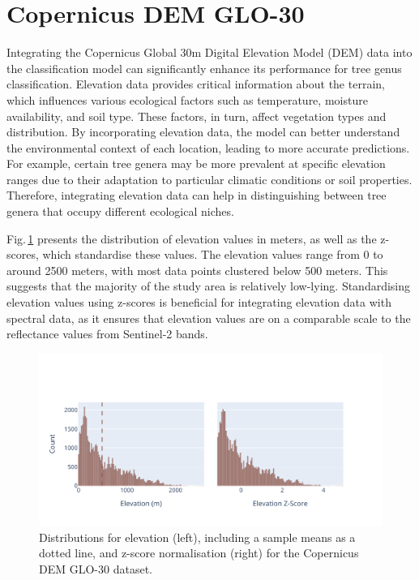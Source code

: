 \section{Copernicus DEM GLO-30}

Integrating the Copernicus Global 30m Digital Elevation Model (DEM) data into the classification model can significantly enhance its performance for tree genus classification. Elevation data provides critical information about the terrain, which influences various ecological factors such as temperature, moisture availability, and soil type. These factors, in turn, affect vegetation types and distribution. By incorporating elevation data, the model can better understand the environmental context of each location, leading to more accurate predictions. For example, certain tree genera may be more prevalent at specific elevation ranges due to their adaptation to particular climatic conditions or soil properties. Therefore, integrating elevation data can help in distinguishing between tree genera that occupy different ecological niches.

Fig.\,\ref{fig:elevation_hist} presents the distribution of elevation values in meters, as well as the z-scores, which standardise these values. The elevation values range from 0 to around 2500 meters, with most data points clustered below 500 meters. This suggests that the majority of the study area is relatively low-lying. Standardising elevation values using z-scores is beneficial for integrating elevation data with spectral data, as it ensures that elevation values are on a comparable scale to the reflectance values from Sentinel-2 bands. 

\begin{figure}[ht]
    \centering
    \includegraphics[width=0.98\linewidth, trim={15pt 25pt 10pt 50pt}, clip]{figures/figures_features/elevation_hist.pdf}
    \caption{Distributions for elevation (left), including a sample means as a dotted line, 
    and z-score normalisation (right) for the Copernicus DEM GLO-30 dataset.}
    \label{fig:elevation_hist}
\end{figure}

